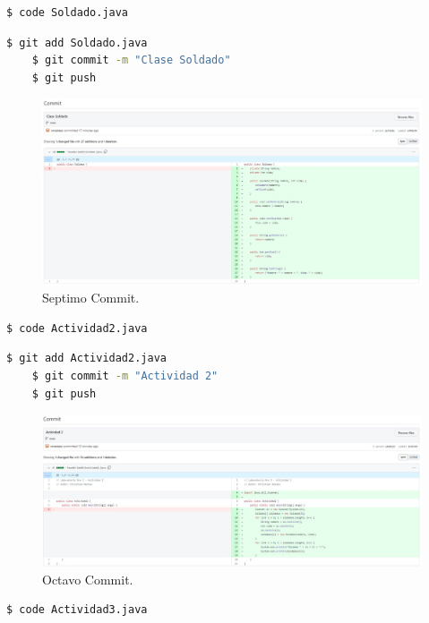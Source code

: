 \documentclass{article}
\begin{document}
\begin{lstlisting}[language=bash,caption={Actualizando Soldado.java}]
	$ code Soldado.java
\end{lstlisting}
\begin{lstlisting}[language=bash,caption={Septimo Commit / Soldado.java}]
	$ git add Soldado.java
	$ git commit -m "Clase Soldado"
	$ git push
\end{lstlisting}
\begin{figure}[H]
	\centering
	\includegraphics[width=1\textwidth,keepaspectratio]{img/commit07.jpg}
	\caption{Septimo Commit.}
\end{figure}
\begin{lstlisting}[language=bash,caption={Actualizando Actividad2.java}]
	$ code Actividad2.java
\end{lstlisting}
\begin{lstlisting}[language=bash,caption={Octavo Commit / Soldado.java}]
	$ git add Actividad2.java
	$ git commit -m "Actividad 2"
	$ git push
\end{lstlisting}
\begin{figure}[H]
	\centering
	\includegraphics[width=1\textwidth,keepaspectratio]{img/commit08.jpg}
	\caption{Octavo Commit.}
\end{figure}
\pagebreak
\begin{lstlisting}[language=bash,caption={Actualizando Actividad3.java}]
	$ code Actividad3.java
\end{lstlisting}
\end{document}
